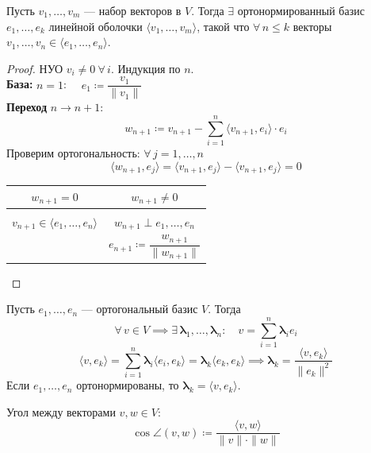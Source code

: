 \newpage

\begin{theorem}
    Пусть $v_1, \dots, v_m$ --- набор векторов в $V$. Тогда $\exists$ ортонормированный базис $e_1, \dots, e_k$
    линейной оболочки $\langle v_1,\dots, v_m\rangle$, такой что $\forall\, n \le k$ векторы $v_1, \dots, v_n \in \langle e_1, \dots, e_n\rangle$.
    \begin{proof}
        НУО $v_i \neq 0\ \forall\, i$. Индукция по $n$.\\[4pt]
        \textbf{База:} $n = 1$: $\quad e_1 \coloneqq \dfrac{v_1}{\|v_1\|}$\\[6pt]
        \textbf{Переход} $n \to n+1$:
        \[
            w_{n+1} \coloneqq v_{n+1} - \sum_{i=1}^{n} \langle v_{n+1}, e_i \rangle \cdot e_i
        \]
        Проверим ортогональность: $\forall\, j = 1,\dots,n$
        \[
            \langle w_{n+1}, e_j \rangle = \langle v_{n+1}, e_j \rangle - \langle v_{n+1}, e_j \rangle = 0
        \]
        \begin{center}
        \begin{tabular}{c|c}
            $w_{n+1} = 0$ & $w_{n+1} \neq 0$ \\[4pt]
            \hline\\[-6pt]
            $v_{n+1} \in \langle e_1, \dots, e_n \rangle$ & $w_{n+1} \perp e_1, \dots, e_n$ \\[6pt]
            & $e_{n+1} \coloneqq \dfrac{w_{n+1}}{\|w_{n+1}\|}$ \\[8pt]
        \end{tabular}
        \end{center}
    \end{proof}
\end{theorem}


\begin{stmt}
    Пусть $e_1, \dots, e_n$ --- ортогональный базис $V$. Тогда
    \[
        \forall\, v \in V \implies \exists\, \mathbf{\lambda}_1, \dots, \mathbf{\lambda}_n : \quad v = \sum_{i=1}
        ^{n} \mathbf{\lambda}_i e_i
    \]
    \[
        \langle v, e_k \rangle = \sum_{i=1}^{n} \mathbf{\lambda}_i \langle e_i, e_k \rangle = \mathbf{\lambda}
        _k \langle e_k, e_k \rangle
        \implies
        \boxed{\mathbf{\lambda}_k = \frac{\langle v, e_k \rangle}{\|e_k\|^2}}
    \]
    Если $e_1, \dots, e_n$ ортонормированы, то $\boxed{\mathbf{\lambda}_k = \langle v, e_k \rangle}$.
\end{stmt}


\begin{definition}
    Угол между векторами $v, w \in V$:
    \[
        \cos \angle(v, w) \coloneqq \frac{\langle v, w \rangle}{\|v\| \cdot \|w\|}
    \]
\end{definition}


